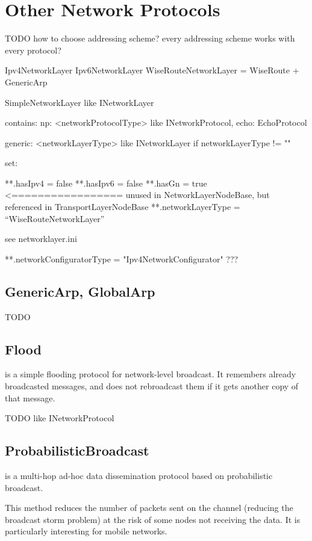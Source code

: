 \chapter{Other Network Protocols}
\label{cha:other-network-protocols}

TODO how to choose addressing scheme?  every addressing scheme works with every protocol?  

Ipv4NetworkLayer
Ipv6NetworkLayer
WiseRouteNetworkLayer = WiseRoute + GenericArp

SimpleNetworkLayer like INetworkLayer

contains:
  np: <networkProtocolType> like INetworkProtocol,
  echo: EchoProtocol

generic: <networkLayerType> like INetworkLayer if networkLayerType != ""

set:

**.hasIpv4 = false
**.hasIpv6 = false
**.hasGn = true  <================= unused in NetworkLayerNodeBase, but referenced in TransportLayerNodeBase
**.networkLayerType = ``WiseRouteNetworkLayer''

see networklayer.ini

**.networkConfiguratorType = "Ipv4NetworkConfigurator"   ???

\section{GenericArp, GlobalArp}

TODO

\section{Flood}

 is a simple flooding protocol for network-level broadcast.
It remembers already broadcasted messages, and does not rebroadcast 
them if it gets another copy of that message.

TODO like INetworkProtocol

\section{ProbabilisticBroadcast}

 is a multi-hop ad-hoc data dissemination 
protocol based on probabilistic broadcast.

This method reduces the number of packets sent on the channel (reducing the
broadcast storm problem) at the risk of some nodes not receiving the data.
It is particularly interesting for mobile networks.

